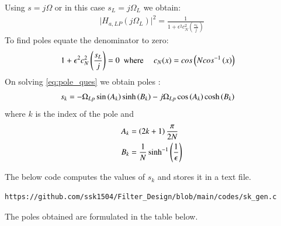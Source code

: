 \documentclass{article}
\begin{document}
\begin{enumerate}
Using $s=j\Omega$ or in this case $s_{L}=j\Omega_{L}$ we obtain:
\begin{align}
    \vert H_{a,LP}(j\Omega_L)\vert^2 = \frac{1}{1 + \epsilon^2c_N^2(\frac{s_L}{j})}
\end{align}
To find poles equate the denominator to zero:
\begin{align}
    {1 + \epsilon^2c_N^2\ensuremath{\left(\frac{s_L}{j}\right)}} &=0\hspace{5pt }
    \text{where } \hspace{10pt} c_N(x) = cos\left(Ncos^{-1}\left(x\right)\right) \label{eq:pole_ques}
\end{align}
On solving \eqref{eq:pole_ques} we obtain poles :
\begin{align}
    s_{k} &= -\Omega_{Lp} \sin\left(A_k\right)\sinh\left(B_k\right) - j\Omega_{Lp}\cos\left(A_k\right)\cosh\left(B_k\right)
\end{align}
where $k$ is the index of the pole and \\
\begin{align}
    A_k &= \left(2k+1\right)\frac{\pi}{2N}\\
    B_k &= \frac{1}{N} \sinh^{-1}\left(\frac{1}{\epsilon}\right)
\end{align}

The below code computes the values of $s_k$ and stores it in a text file. 
\begin{lstlisting}
https://github.com/ssk1504/Filter_Design/blob/main/codes/sk_gen.c
\end{lstlisting}
The poles obtained are formulated in the table below.



\end{enumerate}
\end{document}
